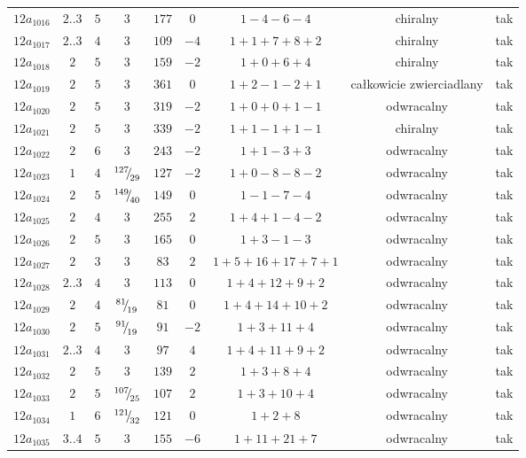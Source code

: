 \begin{longtable}{ccccccccc}
$12a_{1016}$ & $2..3$ & $5$ & $3$ & $177$ & $0$ & $1-4-6-4$ & chiralny & tak \\
$12a_{1017}$ & $2..3$ & $4$ & $3$ & $109$ & $-4$ & $1+1+7+8+2$ & chiralny & tak \\
$12a_{1018}$ & $2$ & $5$ & $3$ & $159$ & $-2$ & $1+0+6+4$ & chiralny & tak \\
$12a_{1019}$ & $2$ & $5$ & $3$ & $361$ & $0$ & $1+2-1-2+1$ & całkowicie zwierciadlany & tak \\
$12a_{1020}$ & $2$ & $5$ & $3$ & $319$ & $-2$ & $1+0+0+1-1$ & odwracalny & tak \\
$12a_{1021}$ & $2$ & $5$ & $3$ & $339$ & $-2$ & $1+1-1+1-1$ & chiralny & tak \\
$12a_{1022}$ & $2$ & $6$ & $3$ & $243$ & $-2$ & $1+1-3+3$ & odwracalny & tak \\
$12a_{1023}$ & $1$ & $4$ & ${}^{127}{\mskip -5mu/\mskip -3mu}_{29}$ & $127$ & $-2$ & $1+0-8-8-2$ & odwracalny & tak \\
$12a_{1024}$ & $2$ & $5$ & ${}^{149}{\mskip -5mu/\mskip -3mu}_{40}$ & $149$ & $0$ & $1-1-7-4$ & odwracalny & tak \\
$12a_{1025}$ & $2$ & $4$ & $3$ & $255$ & $2$ & $1+4+1-4-2$ & odwracalny & tak \\
$12a_{1026}$ & $2$ & $5$ & $3$ & $165$ & $0$ & $1+3-1-3$ & odwracalny & tak \\
$12a_{1027}$ & $2$ & $3$ & $3$ & $83$ & $2$ & $1+5+16+17+7+1$ & odwracalny & tak \\
$12a_{1028}$ & $2..3$ & $4$ & $3$ & $113$ & $0$ & $1+4+12+9+2$ & odwracalny & tak \\
$12a_{1029}$ & $2$ & $4$ & ${}^{81}{\mskip -5mu/\mskip -3mu}_{19}$ & $81$ & $0$ & $1+4+14+10+2$ & odwracalny & tak \\
$12a_{1030}$ & $2$ & $5$ & ${}^{91}{\mskip -5mu/\mskip -3mu}_{19}$ & $91$ & $-2$ & $1+3+11+4$ & odwracalny & tak \\
$12a_{1031}$ & $2..3$ & $4$ & $3$ & $97$ & $4$ & $1+4+11+9+2$ & odwracalny & tak \\
$12a_{1032}$ & $2$ & $5$ & $3$ & $139$ & $2$ & $1+3+8+4$ & odwracalny & tak \\
$12a_{1033}$ & $2$ & $5$ & ${}^{107}{\mskip -5mu/\mskip -3mu}_{25}$ & $107$ & $2$ & $1+3+10+4$ & odwracalny & tak \\
$12a_{1034}$ & $1$ & $6$ & ${}^{121}{\mskip -5mu/\mskip -3mu}_{32}$ & $121$ & $0$ & $1+2+8$ & odwracalny & tak \\
$12a_{1035}$ & $3..4$ & $5$ & $3$ & $155$ & $-6$ & $1+11+21+7$ & odwracalny & tak \\

\end{longtable}
